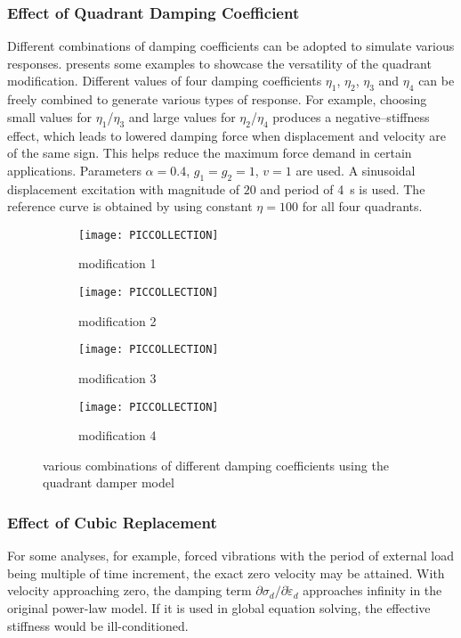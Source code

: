 \subsubsection{Effect of Quadrant Damping Coefficient}
Different combinations of damping coefficients can be adopted to simulate various responses.  presents some examples to showcase the versatility of the quadrant modification. Different values of four damping coefficients $\eta_1$, $\eta_2$, $\eta_3$ and $\eta_4$ can be freely combined to generate various types of response. For example, choosing small values for $\eta_1$/$\eta_3$ and large values for $\eta_2$/$\eta_4$ produces a negative--stiffness effect, which leads to lowered damping force when displacement and velocity are of the same sign. This helps reduce the maximum force demand in certain applications. Parameters $\alpha=0.4$, $g_1=g_2=1$, $v=1$ are used. A sinusoidal displacement excitation with magnitude of $20$ and period of \SI{4}{\second} is used. The reference curve is obtained by using constant $\eta=100$ for all four quadrants.
\begin{figure}[htb]
\centering\scriptsize
\begin{subfigure}{.49\textwidth}\centering
\texttt{[image: PICCOLLECTION]}
\caption{modification 1}\label{fig:mod_a}
\end{subfigure}\hfill
\begin{subfigure}{.49\textwidth}\centering
\texttt{[image: PICCOLLECTION]}
\caption{modification 2}\label{fig:mod_b}
\end{subfigure}
\begin{subfigure}{.49\textwidth}\centering
\texttt{[image: PICCOLLECTION]}
\caption{modification 3}\label{fig:mod_c}
\end{subfigure}\hfill
\begin{subfigure}{.49\textwidth}\centering
\texttt{[image: PICCOLLECTION]}
\caption{modification 4}\label{fig:mod_d}
\end{subfigure}
\caption{various combinations of different damping coefficients using the quadrant damper model}\label{fig:mod}
\end{figure}
\subsubsection{Effect of Cubic Replacement}
For some analyses, for example, forced vibrations with the period of external load being multiple of time increment, the exact zero velocity may be attained. With velocity approaching zero, the damping term $\partial\sigma_d/\partial\dot\varepsilon_d$ approaches infinity in the original power-law model. If it is used in global equation solving, the effective stiffness would be ill-conditioned.

